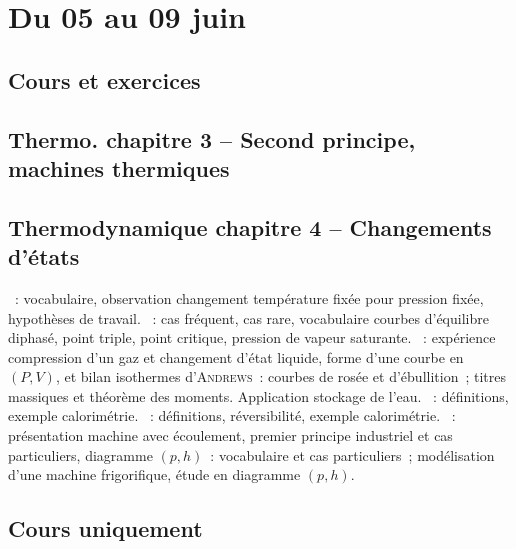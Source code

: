 \documentclass[a4paper, 11pt, final, garamond]{book}
\begin{document}
\setcounter{chapter}{28}

\chapter{Du 05 au 09 juin}

\section{Cours et exercices}

\section*{Thermo. chapitre 3 -- Second principe, machines thermiques}
\begin{enumerate}[label=\Roman*]
\end{enumerate}

\section*{Thermodynamique chapitre 4 -- Changements d'états}
\begin{enumerate}[label=\Roman*]
  ~: vocabulaire, observation changement température fixée
    pour pression fixée, hypothèses de travail.
  ~: cas fréquent, cas rare, vocabulaire courbes
    d'équilibre diphasé, point triple, point critique, pression de vapeur
    saturante.
  ~: expérience compression d'un gaz et
    changement d'état liquide, forme d'une courbe en $(P,V)$, et bilan
    isothermes d'\textsc{Andrews}~: courbes de rosée et d'ébullition~; titres
    massiques et théorème des moments. Application stockage de l'eau.
  ~: définitions, exemple
    calorimétrie.
  ~: définitions, réversibilité,
    exemple calorimétrie.
  ~: présentation machine avec
    écoulement, premier principe industriel et cas particuliers, diagramme
    $(p,h)$~: vocabulaire et cas particuliers~; modélisation d'une machine
    frigorifique, étude en diagramme $(p,h)$.
\end{enumerate}

\section{Cours uniquement}
\end{document}
